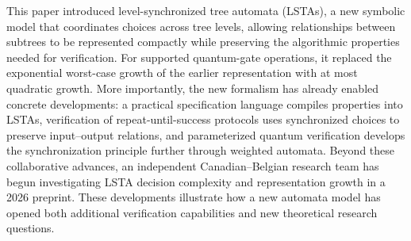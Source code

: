 \documentclass[10pt,a4paper]{article}
\begin{document}
This paper introduced level-synchronized tree automata (LSTAs), a new symbolic model that coordinates choices across tree levels, allowing relationships between subtrees to be represented compactly while preserving the algorithmic properties needed for verification. For supported quantum-gate operations, it replaced the exponential worst-case growth of the earlier representation with at most quadratic growth. More importantly, the new formalism has already enabled concrete developments: a practical specification language compiles properties into LSTAs, verification of repeat-until-success protocols uses synchronized choices to preserve input--output relations, and parameterized quantum verification develops the synchronization principle further through weighted automata. Beyond these collaborative advances, an independent Canadian--Belgian research team has begun investigating LSTA decision complexity and representation growth in a 2026 preprint. These developments illustrate how a new automata model has opened both additional verification capabilities and new theoretical research questions.
\end{document}
